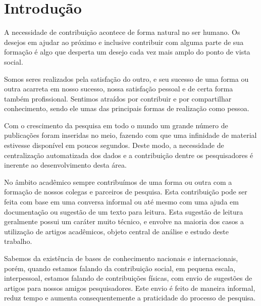 \chapter[Introdução]{Introdução}


A necessidade de contribuição acontece de forma natural no ser humano. Os desejos em ajudar ao próximo e inclusive contribuir com alguma parte de sua formação é algo que desperta um desejo cada vez mais amplo do ponto de vista social.

Somos seres realizados pela satisfação do outro, e seu sucesso de uma forma ou outra acarreta em nosso sucesso, nossa satisfação pessoal e de certa forma também profissional. Sentimos atraídos por contribuir e por compartilhar conhecimento, sendo ele umas das principais formas de realização como pessoa.

Com o crescimento da pesquisa em todo o mundo um grande número de publicações foram inseridas no meio, fazendo com que uma infinidade de material estivesse disponível em poucos segundos. Deste modo, a necessidade de centralização automatizada dos dados e a contribuição dentre os pesquisadores é inerente ao desenvolvimento desta área. 

No âmbito acadêmico sempre contribuímos de uma forma ou outra com a formação de nossos colegas e parceiros de pesquisa. Esta contribuição pode ser feita com base em uma conversa informal ou até mesmo com uma ajuda em documentação ou sugestão de um texto para leitura. Esta sugestão de leitura geralmente possui um caráter muito técnico, e envolve na maioria dos casos a utilização de artigos acadêmicos, objeto central de análise e estudo deste trabalho.

\begin{textoalterado}
Sabemos da existência de bases de conhecimento nacionais e internacionais, porém, quando estamos falando da contribuição social, em pequena escala, interpessoal, estamos falando de contribuições físicas, com envio de sugestões de artigos para nossos amigos pesquisadores. Este envio é feito de maneira informal, reduz tempo e aumenta consequentemente a praticidade do processo de pesquisa.
\end{textoalterado}

